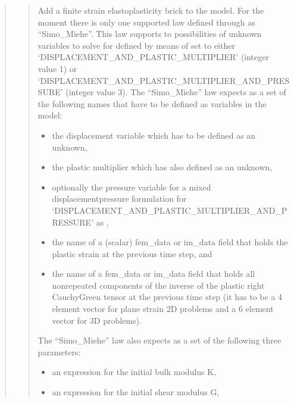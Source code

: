 \documentclass[a4paper,11pt,english]{sphinxmanual}
\begin{document}
\begin{quote}
\begin{quote}

Add a finite strain elastoplasticity brick to the model.
For the moment there is only one supported law defined through
 as “Simo\_Miehe”.
This law supports to possibilities of unknown variables to solve for
defined by means of  set to either
‘DISPLACEMENT\_AND\_PLASTIC\_MULTIPLIER’ (integer value 1) or
‘DISPLACEMENT\_AND\_PLASTIC\_MULTIPLIER\_AND\_PRESSURE’ (integer value 3).
The  “Simo\_Miehe” law expects as  a set of the
following names that have to be defined as variables in the model:
\begin{itemize}
\item {} 
the displacement variable which has to be defined as an unknown,

\item {} 
the plastic multiplier which has also defined as an unknown,

\item {} 
optionally the pressure variable for a mixed displacement\sphinxhyphen{}pressure
formulation for ‘DISPLACEMENT\_AND\_PLASTIC\_MULTIPLIER\_AND\_PRESSURE’
as ,

\item {} 
the name of a (scalar) fem\_data or im\_data field that holds the
plastic strain at the previous time step, and

\item {} 
the name of a fem\_data or im\_data field that holds all
non\sphinxhyphen{}repeated components of the inverse of the plastic right
Cauchy\sphinxhyphen{}Green tensor at the previous time step
(it has to be a 4 element vector for plane strain 2D problems
and a 6 element vector for 3D problems).

\end{itemize}

The  “Simo\_Miehe” law also expects as  a set of the
following three parameters:
\begin{itemize}
\item {} 
an expression for the initial bulk modulus K,

\item {} 
an expression for the initial shear modulus G,


\end{itemize}
\end{quote}
\end{quote}
\end{document}
